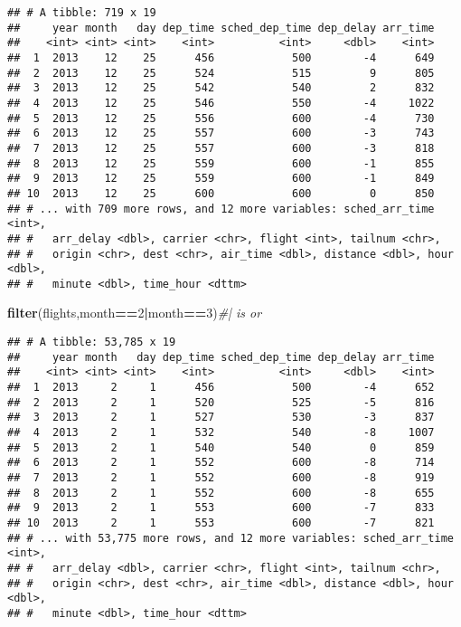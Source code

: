 \documentclass[]{article}
\newenvironment{Shaded}{\begin{snugshade}}{\end{snugshade}}
\newcommand{\CommentTok}[1]{\textcolor[rgb]{0.56,0.35,0.01}{\textit{#1}}}
\newcommand{\DecValTok}[1]{\textcolor[rgb]{0.00,0.00,0.81}{#1}}
\newcommand{\KeywordTok}[1]{\textcolor[rgb]{0.13,0.29,0.53}{\textbf{#1}}}
\newcommand{\NormalTok}[1]{#1}
\newcommand{\OperatorTok}[1]{\textcolor[rgb]{0.81,0.36,0.00}{\textbf{#1}}}
\begin{document}
\begin{verbatim}
## # A tibble: 719 x 19
##     year month   day dep_time sched_dep_time dep_delay arr_time
##    <int> <int> <int>    <int>          <int>     <dbl>    <int>
##  1  2013    12    25      456            500        -4      649
##  2  2013    12    25      524            515         9      805
##  3  2013    12    25      542            540         2      832
##  4  2013    12    25      546            550        -4     1022
##  5  2013    12    25      556            600        -4      730
##  6  2013    12    25      557            600        -3      743
##  7  2013    12    25      557            600        -3      818
##  8  2013    12    25      559            600        -1      855
##  9  2013    12    25      559            600        -1      849
## 10  2013    12    25      600            600         0      850
## # ... with 709 more rows, and 12 more variables: sched_arr_time <int>,
## #   arr_delay <dbl>, carrier <chr>, flight <int>, tailnum <chr>,
## #   origin <chr>, dest <chr>, air_time <dbl>, distance <dbl>, hour <dbl>,
## #   minute <dbl>, time_hour <dttm>
\end{verbatim}

\begin{Shaded}
\begin{Highlighting}[]
\KeywordTok{filter}\NormalTok{(flights,month}\OperatorTok{==}\DecValTok{2}\OperatorTok{|}\NormalTok{month}\OperatorTok{==}\DecValTok{3}\NormalTok{)}\CommentTok{#| is or}
\end{Highlighting}
\end{Shaded}

\begin{verbatim}
## # A tibble: 53,785 x 19
##     year month   day dep_time sched_dep_time dep_delay arr_time
##    <int> <int> <int>    <int>          <int>     <dbl>    <int>
##  1  2013     2     1      456            500        -4      652
##  2  2013     2     1      520            525        -5      816
##  3  2013     2     1      527            530        -3      837
##  4  2013     2     1      532            540        -8     1007
##  5  2013     2     1      540            540         0      859
##  6  2013     2     1      552            600        -8      714
##  7  2013     2     1      552            600        -8      919
##  8  2013     2     1      552            600        -8      655
##  9  2013     2     1      553            600        -7      833
## 10  2013     2     1      553            600        -7      821
## # ... with 53,775 more rows, and 12 more variables: sched_arr_time <int>,
## #   arr_delay <dbl>, carrier <chr>, flight <int>, tailnum <chr>,
## #   origin <chr>, dest <chr>, air_time <dbl>, distance <dbl>, hour <dbl>,
## #   minute <dbl>, time_hour <dttm>
\end{verbatim}
\end{document}
